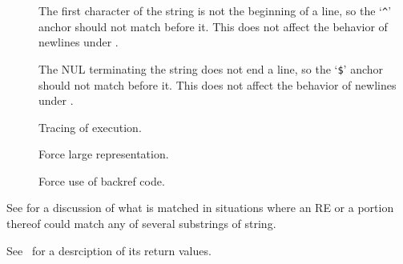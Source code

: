 \begin{description}

\item[] %
  The first character of the string is not the beginning of a line, so
  the `\verb|^|' anchor should not match before it. This does not
  affect the behavior of newlines under .

\item[] %
  The NUL terminating the string does not end a line, so the
  `\verb|$|' anchor should not match before it. This does not affect
  the behavior of newlines under .


\item[]
  Tracing of execution.

\item[]
  Force large representation.

\item[]
  Force use of backref code.

\end{description}

See  for a discussion of what is matched in
situations where an RE or a portion thereof could match any of several
substrings of string.

See \ for a desrciption of its return values.



